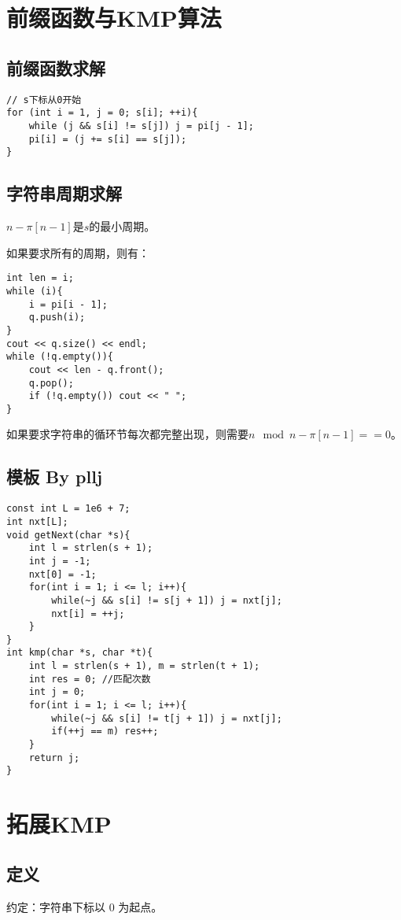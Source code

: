 \section{前缀函数与KMP算法}
\subsection{前缀函数求解}
\begin{lstlisting}
// s下标从0开始
for (int i = 1, j = 0; s[i]; ++i){
    while (j && s[i] != s[j]) j = pi[j - 1];
    pi[i] = (j += s[i] == s[j]);
}
\end{lstlisting}
\subsection{字符串周期求解}
$n-\pi[n-1]$是$s$的最小周期。\par
如果要求所有的周期，则有：
\begin{lstlisting}
int len = i;
while (i){
    i = pi[i - 1];
    q.push(i);
}
cout << q.size() << endl;
while (!q.empty()){
    cout << len - q.front();
    q.pop();
    if (!q.empty()) cout << " ";
}
\end{lstlisting}\par
如果要求字符串的循环节每次都完整出现，则需要$n\mod n-\pi[n-1]==0$。

\subsection{模板 By pllj}
\begin{lstlisting}
const int L = 1e6 + 7;
int nxt[L];
void getNext(char *s){
    int l = strlen(s + 1);
    int j = -1;
    nxt[0] = -1;
    for(int i = 1; i <= l; i++){
        while(~j && s[i] != s[j + 1]) j = nxt[j];
        nxt[i] = ++j;
    }
}
int kmp(char *s, char *t){
    int l = strlen(s + 1), m = strlen(t + 1);
    int res = 0; //匹配次数
    int j = 0;
    for(int i = 1; i <= l; i++){
        while(~j && s[i] != t[j + 1]) j = nxt[j];
        if(++j == m) res++;
    }
    return j;
}
\end{lstlisting}

\section{拓展KMP}
\subsection{定义}
约定：字符串下标以 $0$ 为起点。

